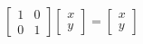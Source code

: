 \documentclass{article}
\begin{document}
\thispagestyle{empty}


$$
\begin{bmatrix}1&0\\0&1\end{bmatrix}
\begin{bmatrix}x\\y\end{bmatrix} = \begin{bmatrix}x\\y\end{bmatrix}
$$
\end{document}
